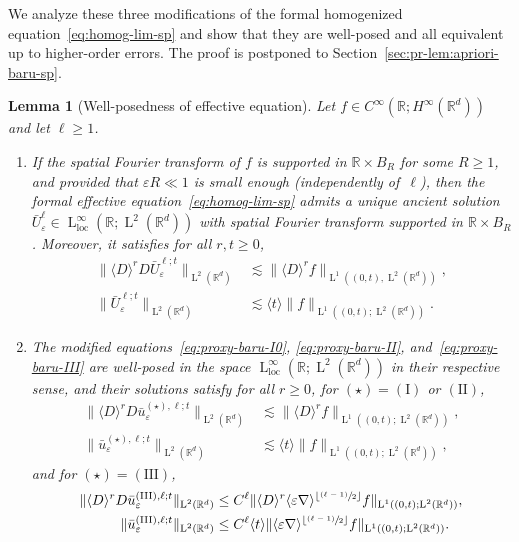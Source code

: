 \documentclass[10pt]{amsart}
\newenvironment{enumeratei}
{\bgroup\def\theenumi{\roman{enumi}}\def\theenumii{\arabic{enumii}}\begin{enumerate}}
{\end{enumerate}\egroup}
\newcommand{\psfrac}[2]{\sfrac{(#1)}{#2}}
\theoremstyle{plain}
\newtheorem{lem0}[theor0]{Lemma}
\newenvironment{lem}
{\renewcommand{\qedsymbol}{$\lozenge$}\pushQED{\qed}\begin{lem0}}
{\popQED\end{lem0}}
\theoremstyle{definition}
\numberwithin{equation}{section}
\newcommand{\e}{\varepsilon}
\newcommand{\R}{\mathbb R}
\newcommand{\loc}{{\operatorname{loc}}}
\newcommand{\Ld}{\operatorname{L}}
\begin{document}
We analyze these three modifications of the formal homogenized equation~\eqref{eq:homog-lim-sp} and show that they are well-posed and all equivalent up to higher-order errors.
The proof is postponed to Section~\ref{sec:pr-lem:apriori-baru-sp}.

\begin{lem}[Well-posedness of effective equation]\label{lem:apriori-baru-sp}
Let $f\in C^\infty(\R;H^\infty(\R^d))$ and let $\ell\ge1$.
\begin{enumeratei}
\item\label{lem:apriori-baru-spi} If the spatial Fourier transform of $f$ is supported in $\R\times B_R$ for some $R\ge1$, and provided that $\e R\ll1$ is small enough (independently of~$\ell$), then the formal effective equation~\eqref{eq:homog-lim-sp} admits a unique ancient solution $\bar U_\e^\ell\in\Ld^\infty_\loc(\R;\Ld^2(\R^d))$ with spatial Fourier transform supported in $\R\times B_R$.
Moreover, it satisfies for all $r,t\ge0$,
\begin{align*}
\|\langle D\rangle^rD\bar U_\e^{\ell;t}\|_{\Ld^2(\R^d)}&\lesssim\|\langle D\rangle^rf\|_{\Ld^1((0,t),\Ld^2(\R^d))},\\
\|\bar U_\e^{\ell;t}\|_{\Ld^2(\R^d)}&\lesssim\langle t\rangle\|f\|_{\Ld^1((0,t);\Ld^2(\R^d))}.
\end{align*}
\item\label{lem:apriori-baru-spii} The modified equations~\eqref{eq:proxy-baru-I0}, \eqref{eq:proxy-baru-II}, and~\eqref{eq:proxy-baru-III} are well-posed in the space $\Ld^\infty_\loc(\R;\Ld^2(\R^d))$ in their respective sense, and their solutions satisfy for all $r\ge0$, for $(\star)=\operatorname{(I)}$ or $\operatorname{(II)}$,
\begin{align*}
\|\langle D\rangle^rD\bar u_\e^{{(\star)},\ell;t}\|_{\Ld^2(\R^d)}&\lesssim\|\langle D\rangle^rf\|_{\Ld^1((0,t);\Ld^2(\R^d))},
\\
\|\bar u_\e^{(\star),\ell;t}\|_{\Ld^2(\R^d)}&\lesssim\langle t\rangle\|f\|_{\Ld^1((0,t);\Ld^2(\R^d))},
\end{align*}
and for $(\star)=\operatorname{(III)}$,
\begin{align*}
\|\langle D\rangle^rD\bar u_\e^{\operatorname{(III)},\ell;t}\|_{\Ld^2(\R^d)}&\le C^{\ell}\|\langle D\rangle^r\langle\e\nabla\rangle^{\lfloor\psfrac{\ell-1}2\rfloor}f\|_{\Ld^1((0,t);\Ld^2(\R^d))},\\
\|\bar u_\e^{\operatorname{(III)},\ell;t}\|_{\Ld^2(\R^d)}&\le C^{\ell}\langle t\rangle\|\langle \e\nabla\rangle^{\lfloor\psfrac{\ell-1}2\rfloor}f\|_{\Ld^1((0,t);\Ld^2(\R^d))}.
\end{align*}


\end{enumeratei}
\end{lem}
\end{document}
